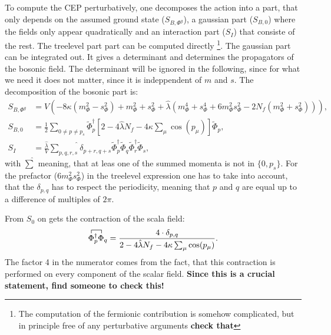 To compute the CEP perturbatively, one decomposes the action into a part, that only depends on the assumed ground state ($S_{B,\Phi^g}$), 
a gaussian part ($S_{B,0}$) where the fields only appear quadratically and an interaction part ($S_I$) that consiste of the rest. The treelevel part 
part can be computed directly \footnote{The computation of the fermionic contribution is somehow complicated, but in principle 
free of any perturbative arguments \textbf{check that}}.  The gaussian part can be integrated out. It gives a determinant and determines the propagators 
of the bosonic field. The determinant will be ignored in the following, since for what we need it does not matter, since it is indeppendent of $m$ and $s$.
The decomposition of the bosonic part is:
\begin{align}
 S_{B,\Phi^g} &= V \left( -8 \kappa \left( m_{\Phi}^2 - s_{\Phi}^2 \right)  +  m_{\Phi}^2 + s_{\Phi}^2 
             + \hat\lambda \left( m_{\Phi}^4 + s_{\Phi}^4 + 6 m_{\Phi}^2s_{\Phi}^2 - 2 N_f \left(m_{\Phi}^2 + s_{\Phi}^2\right) \right) \right) ,
             \label{eq:BosonicTreelevelCEP} \\
 S_{B,0}      &= \frac{1}{2}  \sum\limits_{0\neq p \neq p_s}  \tilde\Phi_p^{\dagger}  
              \left[ 2 - 4 \hat\lambda N_f - 4 \kappa \sum_{\mu} \cos(p_{\mu}) \right]  \tilde\Phi_p ,
              \label{eq:BosonicGaussianCEP} \\
 S_I        &= \frac{\hat\lambda}{V} \hat{\sum\limits_{p,q,r,s}}\delta_{p+r,q+s} \tilde\Phi_p^{\dagger} \tilde\Phi_q \tilde\Phi_r^{\dagger} \tilde\Phi_s,
              \label{eq:BosonicInteractionCEP}
\end{align}
with $\hat\sum$ meaning, that at leas one of the summed momenta is not in $\{0,p_s\}$. For the prefactor ($6 m_{\Phi}^2s_{\Phi}^2$) in the treelevel 
expression one has to take into account, that the $\delta_{p,q}$ has to respect the periodicity, meaning that $p$ and $q$ are equal up to a 
difference of multiples of $2\pi$.

From $S_0$ on gets the contraction of the scala field:
\begin{equation}\label{eq:ContractionOfBosonicField}
 \contraction{}{\Phi}{{}^\dagger_p}{\Phi{}}  \Phi^\dagger_p \Phi_q = \frac{4 \cdot \delta_{p,q}}{2 - 4 \hat\lambda N_f - 4 \kappa \sum_{\mu} \cos(p_{\mu}) }.
\end{equation}
The factor 4 in the numerator comes from the fact, that this contraction is performed on every component of the scalar field. \textbf{Since this is a crucial statement, find someone to check this!}

